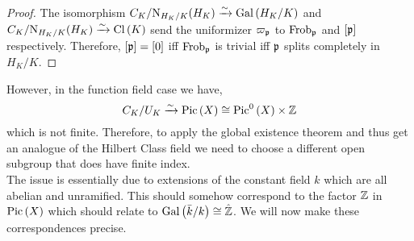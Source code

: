 \documentclass[12pt]{article}
\begin{document}
\begin{proof}
The isomorphism $C_K/\mathrm{N}_{H_K/K}(H_K) \xrightarrow{\sim} \mathrm{Gal}\left( H_K/K \right)$ and $C_K/\mathrm{N}_{H_K/K}(H_K) \xrightarrow{\sim} \mathrm{Cl} \left( K \right)$ send the uniformizer $\varpi_{\mathfrak{p}}$ to $\mathrm{Frob}_{\mathfrak{p}}$ and $[\mathfrak{p}]$ respectively. Therefore, $[\mathfrak{p}] = [0]$ iff $\mathrm{Frob}_{\mathfrak{p}}$ is trivial iff $\mathfrak{p}$ splits completely in $H_K/K$. 
\end{proof}

However, in the function field case we have,
\[ C_K / U_K \xrightarrow{\sim} \mathrm{Pic} \left( X \right) \cong \mathrm{Pic}^0\left( X \right) \times \mathbb{Z} \]
which is not finite. Therefore, to apply the global existence theorem and thus get an analogue of the Hilbert Class field we need to choose a different open subgroup that does have finite index. 
\bigskip\\
The issue is essentially due to extensions of the constant field $k$ which are all abelian and unramified. This should somehow correspond to the factor $\mathbb{Z}$ in $\mathrm{Pic} \left( X \right)$ which should relate to $\mathrm{Gal}\left( \bar{k}/k \right) \cong \hat{\mathbb{Z}}$. We will now make these correspondences precise. 
\end{document}

